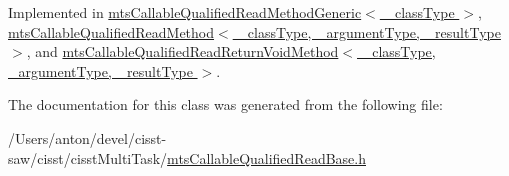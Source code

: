 Implemented in \hyperlink{classmts_callable_qualified_read_method_generic_a7c8f5ed8525397fdfeda642e0d3888d1}{mts\+Callable\+Qualified\+Read\+Method\+Generic$<$ \+\_\+class\+Type $>$}, \hyperlink{classmts_callable_qualified_read_method_a279196a1b216f18f168c98a17dc89901}{mts\+Callable\+Qualified\+Read\+Method$<$ \+\_\+class\+Type, \+\_\+argument\+Type, \+\_\+result\+Type $>$}, and \hyperlink{classmts_callable_qualified_read_return_void_method_a269843820d9e3ae43bcdd51b0c5c6190}{mts\+Callable\+Qualified\+Read\+Return\+Void\+Method$<$ \+\_\+class\+Type, \+\_\+argument\+Type, \+\_\+result\+Type $>$}.



The documentation for this class was generated from the following file\+:\begin{DoxyCompactItemize}
\item 
/\+Users/anton/devel/cisst-\/saw/cisst/cisst\+Multi\+Task/\hyperlink{mts_callable_qualified_read_base_8h}{mts\+Callable\+Qualified\+Read\+Base.\+h}\end{DoxyCompactItemize}
